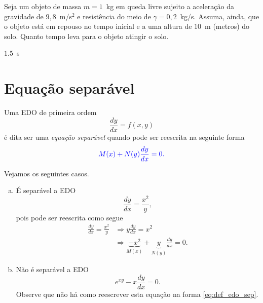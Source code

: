 \begin{exer}
  Seja um objeto de massa $m = 1$~kg em queda livre sujeito a aceleração da gravidade de $9,8$~m/s$^2$ e resistência do meio de $\gamma = 0,2$~kg/s. Assuma, ainda, que o objeto está em repouso no tempo inicial e a uma altura de $10$~m (metros) do solo. Quanto tempo leva para o objeto atingir o solo.
\end{exer}
\begin{resp}
  $1.5$~s
\end{resp}

\section{Equação separável}\label{cap_edo1ordem_sec_eqsep}

Uma EDO de primeira ordem
\begin{equation}
  \frac{dy}{dx} = f(x,y)
\end{equation}
é dita ser uma \emph{equação separável} quando pode ser reescrita na seguinte forma
\begin{equation}\label{eq:def_edo_sep}
  {\color{blue} M(x) + N(y)\frac{dy}{dx} = 0.}
\end{equation}

\begin{ex}\label{ex:edo_sep_def}
  Vejamos os seguintes casos.
  \begin{enumerate}[a)]
  \item É separável a EDO
    \begin{equation}
      \frac{dy}{dx} = \frac{x^2}{y},
    \end{equation}
    pois pode ser reescrita como segue
    \begin{align}
      \frac{dy}{dx} = \frac{x^2}{y} &\Rightarrow y\frac{dy}{dx} = x^2 \\
                                    &\Rightarrow \underbrace{-x^2}_{M(x)} + \underbrace{y}_{N(y)}\frac{dy}{dx} = 0.
    \end{align}
  \item Não é separável a EDO
    \begin{equation}
      e^{xy} - x\frac{dy}{dx} = 0.
    \end{equation}
    Observe que não há como reescrever esta equação na forma \eqref{eq:def_edo_sep}.
  \end{enumerate}
\end{ex}

